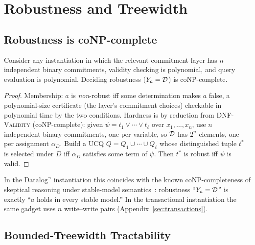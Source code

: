\section{Robustness and Treewidth}
\label{app:robustness-proofs}

\subsection{Robustness is coNP-complete}

\begin{theorem}
  \label{thm:robustness-conp}
  Consider any instantiation in which the relevant commitment layer has $n$
  independent binary commitments, validity checking is polynomial, and query
  evaluation is polynomial. Deciding robustness ($Y_a = \mathcal{D}$) is
  coNP-complete.
\end{theorem}
\begin{proof}
  Membership: $a$ is \emph{non}-robust iff some determination makes $a$ false,
  a polynomial-size certificate (the layer's commitment choices) checkable in
  polynomial time by the two conditions. Hardness is by reduction from
  \textsc{DNF-Validity} (coNP-complete): given
  $\psi = t_1 \vee \cdots \vee t_\ell$ over $x_1, \dots, x_n$, use $n$
  independent binary commitments, one per variable, so $\mathcal{D}$ has $2^n$
  elements, one per assignment $\alpha_D$. Build a UCQ
  $Q = Q_1 \cup \cdots \cup Q_\ell$ whose distinguished tuple $t^\ast$ is
  selected under $D$ iff $\alpha_D$ satisfies some term of $\psi$. Then
  $t^\ast$ is robust iff $\psi$ is valid.
\end{proof}

\noindent
In the $\mbox{Datalog}^\neg$ instantiation this coincides with the known
coNP-completeness of skeptical reasoning under stable-model
semantics~\cite{marek1991autoepistemic}: robustness ``$Y_a = \mathcal{D}$'' is
exactly ``$a$ holds in every stable model.'' In the transactional
instantiation the same gadget uses $n$ write--write pairs
(Appendix~\ref{sec:transactions}).

\subsection{Bounded-Treewidth Tractability}

